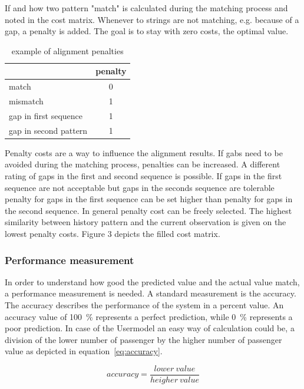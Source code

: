 If and how two pattern "match" is calculated during the matching process and noted in the cost matrix. Whenever to strings are not matching, e.g. because of a gap, a penalty is added. The goal is to stay with zero costs, the optimal value.

\begin{table}[htb]
  \center
  \begin{tabular}{|l|c|}
  \hline 
        & penalty \\ 
  \hline 
  match & 0 \\ 
  \hline 
  mismatch & 1 \\ 
  \hline 
  gap in first sequence & 1 \\ 
  \hline 
  gap in second pattern & 1 \\ 
  \hline 
  \end{tabular}
  \caption{example of alignment penalties}
  \label{tab:alignmentPenalties}
\end{table}

Penalty costs are a way to influence the alignment results. If gabs need to be avoided during the matching process, penalties can be increased. A different rating of gaps in the first and second sequence is possible. If gaps in the first sequence are not acceptable but gaps in the seconds sequence are tolerable penalty for gaps in the first sequence can be set higher than penalty for gaps in the second sequence. In general penalty cost can be freely selected. The highest similarity between history pattern and the current observation is given on the lowest penalty costs. Figure 3 depicts the filled cost matrix.


\subsubsection{Performance measurement}
\label{subsubsec:performanceMeasurement}

In order to understand how good the predicted value and the actual value match, a performance measurement is needed. A standard measurement is the accuracy. The accuracy describes the performance of the system in a percent value. An accuracy value of 100~\% represents a perfect prediction, while 0~\% represents a poor prediction. In case of the Usermodel an easy way of calculation could be, a division of the lower number of passenger by the higher number of passenger value as depicted in equation~\ref{eq:accuracy}.

\begin{equation}
accuracy = \frac{lower~value}{heigher~value}
\label{eq:accuracy}
\end{equation}

